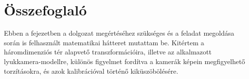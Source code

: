 \section{Összefoglaló}

Ebben a fejezetben a dolgozat megértéséhez szükséges és a feladat megoldása során is felhasznált matematikai hátteret mutattam be. Kitértem a háromdimenziós tér alapvető transzformációira, illetve az alkalmazott lyukkamera-modellre, különös figyelmet fordítva a kamerák képein megfigyelhető torzításokra, és azok kalibrációval történő kiküszöbölésére.
